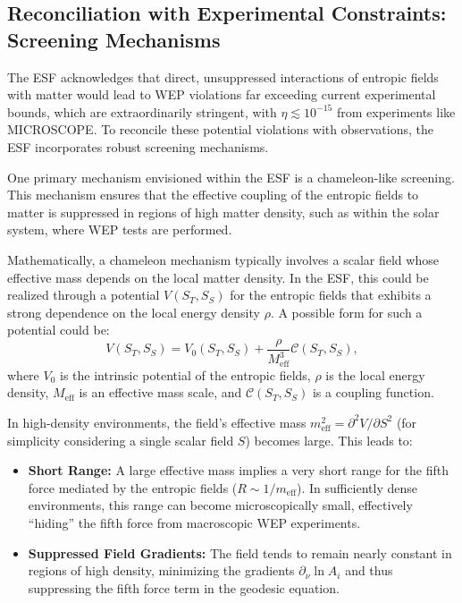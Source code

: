 \documentclass[12pt, a4paper]{article}
\begin{document}
\subsection{Reconciliation with Experimental Constraints: Screening Mechanisms}\label{sec:screening}

The ESF acknowledges that direct, unsuppressed interactions of entropic fields with matter would lead to WEP violations far exceeding current experimental bounds, which are extraordinarily stringent, with $\eta \lesssim 10^{-15}$ from experiments like MICROSCOPE. To reconcile these potential violations with observations, the ESF incorporates robust screening mechanisms.

One primary mechanism envisioned within the ESF is a chameleon-like screening. This mechanism ensures that the effective coupling of the entropic fields to matter is suppressed in regions of high matter density, such as within the solar system, where WEP tests are performed.

Mathematically, a chameleon mechanism typically involves a scalar field whose effective mass depends on the local matter density. In the ESF, this could be realized through a potential $V(S_T, S_S)$ for the entropic fields that exhibits a strong dependence on the local energy density $\rho$. A possible form for such a potential could be:
\begin{equation}
    V(S_T, S_S) = V_0(S_T, S_S) + \frac{\rho}{M_{\text{eff}}^{3}} \mathcal{C}(S_T, S_S),
\end{equation}
where $V_0$ is the intrinsic potential of the entropic fields, $\rho$ is the local energy density, $M_{\text{eff}}$ is an effective mass scale, and $\mathcal{C}(S_T, S_S)$ is a coupling function.

In high-density environments, the field's effective mass $m_{\text{eff}}^2 = \partial^2 V / \partial S^2$ (for simplicity considering a single scalar field $S$) becomes large. This leads to:
\begin{itemize}
    \item \textbf{Short Range:} A large effective mass implies a very short range for the fifth force mediated by the entropic fields ($R \sim 1/m_{\text{eff}}$). In sufficiently dense environments, this range can become microscopically small, effectively ``hiding'' the fifth force from macroscopic WEP experiments.
    \item \textbf{Suppressed Field Gradients:} The field tends to remain nearly constant in regions of high density, minimizing the gradients $\partial_\nu \ln A_i$ and thus suppressing the fifth force term in the geodesic equation.
\end{itemize}
\end{document}
